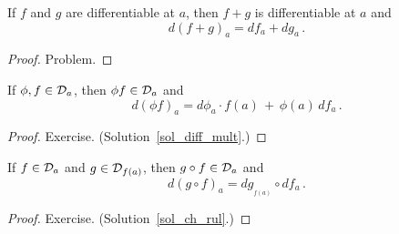 \begin{prop}\label{diff_sum} If $f$ and $g$ are differentiable at $a$, then $f + g$ is
differentiable at $a$ and
   \[ d(f+g)_a = df_a + dg_a\,. \]
\end{prop}

\begin{proof} Problem.  \ns \end{proof}

\begin{prop}\label{diff_mult} If $\phi, f \in \mathcal{D}_a$,
then $\phi f \in \mathcal{D}_a$ and
   \[ d(\phi f)_a = d\phi_a \cdot f(a) \,+\, \phi(a)\,df_a\,. \]
\end{prop}

\begin{proof} Exercise.  (Solution~\ref{sol_diff_mult}.) \ns \end{proof}

\begin{thm}\label{ch_rul} If $f \in \mathcal{D}_a$ and $g \in \mathcal{D}_{f(a)}$, then
$g \circ f \in \mathcal{D}_a$ and
   \[ d(g \circ f)_a = dg_{{}_{\scriptstyle{f(a)}}} \circ df_a\,. \]
\end{thm}

\begin{proof} Exercise.  (Solution~\ref{sol_ch_rul}.) \ns \end{proof}

